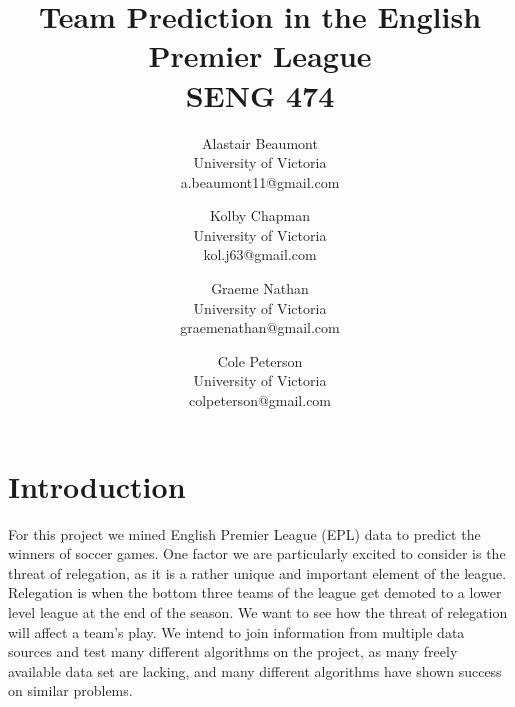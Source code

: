 \documentclass[conference]{IEEEtran}
\begin{document}
%

\title{Team Prediction in the English Premier League\\ {\large SENG 474}}

\author{%
  Alastair Beaumont\\University of Victoria\\a.beaumont11@gmail.com
  \and Kolby Chapman\\University of Victoria\\kol.j63@gmail.com
  \and Graeme Nathan\\University of Victoria\\graemenathan@gmail.com
  \and Cole Peterson\\University of Victoria\\colpeterson@gmail.com
}

\maketitle

\IEEEpeerreviewmaketitle

\section{Introduction}
For this project we mined English Premier League (EPL) data to predict the winners of soccer games. One factor we are particularly excited to consider is the threat of relegation, as it is a rather unique and important element of the league. Relegation is when the bottom three teams of the league get demoted to a lower level league at the end of the season. We want to see how the threat of relegation will affect a team's play. We intend to join information from multiple data sources and test many different algorithms on the project, as many freely available data set are lacking, and many different algorithms have shown success on similar problems.
\end{document}
